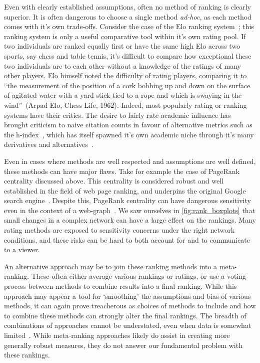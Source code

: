 Even with clearly established assumptions, often no method of ranking is clearly superior. It is often dangerous to choose a single method \emph{ad-hoc}, as each method comes with it's own trade-offs. Consider the case of the Elo ranking system~\cite{elo_rating_1978}; this ranking system is only a useful comparative tool within it's own rating pool. If two individuals are ranked equally first or have the same high Elo across two sports, say chess and table tennis, it's difficult to compare how exceptional these two individuals are to each other without a knowledge of the ratings of many other players. Elo himself noted the difficulty of rating players, comparing it to ``the measurement of the position of a cork bobbing up and down on the surface of agitated water with a yard stick tied to a rope and which is swaying in the wind''~(Arpad Elo, Chess Life, 1962). Indeed, most popularly rating or ranking systems have their critics. The desire to fairly rate academic influence has brought criticism to naive citation counts in favour of alternative metrics such as the h-index~\cite{hirsch_index_2005}, which has itself spawned it's own academic niche through it's many derivatives and alternatives~\cite{alonso_h-index_2009}. 

Even in cases where methods are well respected and assumptions are well defined, these methods can have major flaws. Take for example the case of PageRank centrality discussed above. This centrality is considered robust and well established in the field of web page ranking, and underpins the original Google search engine~\cite{brin_anatomy_1998}. Despite this, PageRank centrality can have dangerous sensitivity even in the context of a web-graph~\cite{ng_link_2001}. We saw ourselves in \autoref{fig:rank_boxplots} that small changes in a complex network can have a large effect on the rankings. Many rating methods are exposed to sensitivity concerns under the right network conditions, and these risks can be hard to both account for and to communicate to a viewer.

An alternative approach may be to join these ranking methods into a meta-ranking. These often either average various rankings or ratings, or use a voting process between methods to combine results into a final ranking. While this approach may appear a tool for `smoothing' the assumptions and bias of various methods, it can again prove treacherous as choices of methods to include and how to combine these methods can strongly alter the final rankings. The breadth of combinations of approaches cannot be understated, even when data is somewhat limited~\cite{BarrowRankingRankings2013}. While meta-ranking approaches likely do assist in creating more generally robust measures, they do not answer our fundamental problem with these rankings.

